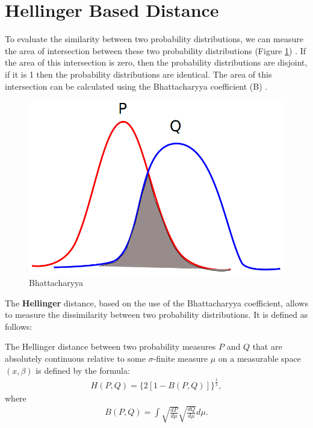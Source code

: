 \section{Hellinger Based Distance}
To evaluate the similarity between two probability distributions, we can measure the area of intersection between these two probability distributions (Figure \ref{Bhattacharyya}) . If the area of this intersection is zero, then the probability distributions are disjoint, if it is 1 then the probability distributions are identical. The area of this intersection can be calculated using the Bhattacharyya coefficient (B) \cite{patra2015new}.

\begin{figure}
\centering
\includegraphics[scale=0.4]{images/bhattacharyya}
\caption{Bhattacharyya}
\label{Bhattacharyya}

\end{figure}

The \textbf{Hellinger} distance, based on the use of the Bhattacharyya coefficient, allows to measure the dissimilarity between two probability distributions. It is defined as follows:

\begin{definition}
The Hellinger distance between two  probability measures  $P$ and $Q$ that are absolutely
continuous relative to some $\sigma$-finite measure $\mu$ on a measurable space $(x,\beta)$ is defined
by the formula:
\begin{eqnarray}
H(P,Q)=\{2[1-B(P,Q)]\}^{\frac{1}{2}},
\end{eqnarray}
where
\begin{eqnarray}
B(P,Q)=\int\sqrt{\frac{dP}{d\mu}}\sqrt{\frac{dQ}{d\mu}}d\mu.
\end{eqnarray}
\end{definition}

